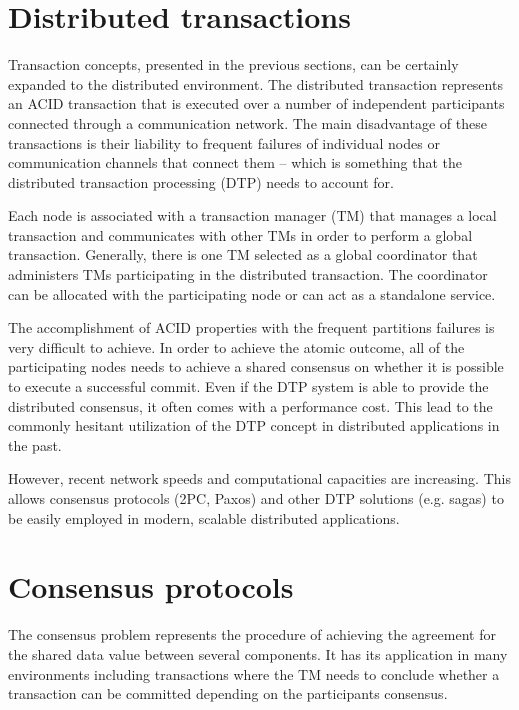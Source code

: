 \documentclass[oneside,
  digital, %
  table,   %
  nolof,     %
  nolot,     %
]{fithesis3}
\begin{document}
\section{Distributed transactions}

Transaction concepts, presented in the previous sections, can be certainly expanded to the distributed environment. The distributed transaction represents an ACID transaction that is executed over a number of independent participants connected through a communication network. The main disadvantage of these transactions is their liability to frequent failures of individual nodes or communication channels that connect them -- which is something that the distributed transaction processing (DTP) needs to account for. 

Each node is associated with a transaction manager (TM) that manages a local transaction and communicates with other TMs in order to perform a global transaction. Generally, there is one TM selected as a global coordinator that administers TMs participating in the distributed transaction. The coordinator can be allocated with the participating node or can act as a standalone service.

The accomplishment of ACID properties with the frequent partitions failures is very difficult to achieve. In order to achieve the atomic outcome, all of the participating nodes needs to achieve a shared consensus on whether it is possible to execute a successful commit. Even if the DTP system is able to provide the distributed consensus, it often comes with a performance cost. This lead to the commonly hesitant utilization of the DTP concept in distributed applications in the past. 

However, recent network speeds and computational capacities are increasing. This allows consensus protocols (2PC, Paxos) and other DTP solutions (e.g. sagas) to be easily employed in modern, scalable distributed applications.



\section{Consensus protocols}
\label{sec:consensus-protocols}

The consensus problem represents the procedure of achieving the  agreement for the shared data value between several components. It has its application in many environments including transactions where the TM needs to conclude whether a transaction can be committed depending on the participants consensus.
\end{document}
